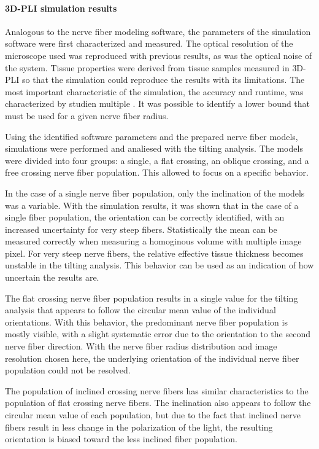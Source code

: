 \paragraph{\acs{3D-PLI} simulation results}
% 
Analogous to the nerve fiber modeling software, the parameters of the simulation software were first characterized and measured.
The optical resolution of the microscope used was reproduced with previous results, as was the optical noise of the system.
Tissue properties were derived from tissue samples measured in \ac{3D-PLI} so that the simulation could reproduce the results with its limitations.
The most important characteristic of the simulation, the accuracy and runtime, was characterized by studien multiple \Voxelsize{}.
It was possible to identify a lower bound that must be used for a given nerve fiber radius.
\par
% 
Using the identified software parameters and the prepared nerve fiber models, simulations were performed and analiesed with the tilting analysis.
The models were divided into four groups: a single, a flat crossing, an oblique crossing, and a free crossing nerve fiber population.
This allowed to focus on a specific behavior.
\par
% 
In the case of a single nerve fiber population, only the inclination of the models was a variable.
With the simulation results, it was shown that in the case of a single fiber population, the orientation can be correctly identified, with an increased uncertainty for very steep fibers.
Statistically the mean can be measured correctly when measuring a homoginous volume with multiple image pixel.
For very steep nerve fibers, the relative effective tissue thickness becomes unstable in the tilting analysis.
This behavior can be used as an indication of how uncertain the results are.
\par
% 
The flat crossing nerve fiber population results in a single value for the tilting analysis that appears to follow the circular mean value of the individual orientations.
With this behavior, the predominant nerve fiber population is mostly visible, with a slight systematic error due to the orientation to the second nerve fiber direction.
With the nerve fiber radius distribution and image resolution chosen here, the underlying orientation of the individual nerve fiber population could not be resolved.
\par
% 
The population of inclined crossing nerve fibers has similar characteristics to the population of flat crossing nerve fibers.
The inclination also appears to follow the circular mean value of each population, but due to the fact that inclined nerve fibers result in less change in the polarization of the light, the resulting orientation is biased toward the less inclined fiber population.
